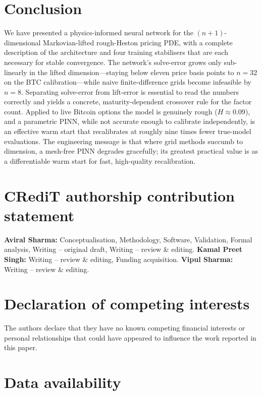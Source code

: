\documentclass[review,12pt]{elsarticle}
\begin{document}
\section{Conclusion}
\label{sec:conc}

We have presented a physics-informed neural network for the $(n{+}1)$-dimensional
Markovian-lifted rough-Heston pricing PDE, with a complete description of the
architecture and four training stabilisers that are each necessary for stable
convergence.  The network's solve-error grows only sub-linearly in the lifted
dimension---staying below eleven price basis points to $n{=}32$ on the BTC
calibration---while naive finite-difference grids become infeasible by $n{=}8$.
Separating solve-error from lift-error is essential to read the numbers correctly
and yields a concrete, maturity-dependent crossover rule for the factor count.
Applied to live Bitcoin options the model is genuinely rough ($H{\approx}0.09$), and
a parametric PINN, while not accurate enough to calibrate independently, is an
effective warm start that recalibrates at roughly nine times fewer true-model
evaluations.  The engineering message is that where grid methods succumb to
dimension, a mesh-free PINN degrades gracefully; its greatest practical value is
as a differentiable warm start for fast, high-quality recalibration.

\section*{CRediT authorship contribution statement}

\textbf{Aviral Sharma:} Conceptualisation, Methodology, Software, Validation,
Formal analysis, Writing -- original draft, Writing -- review \& editing.
\textbf{Kamal Preet Singh:} Writing -- review \& editing, Funding acquisition.
\textbf{Vipul Sharma:} Writing -- review \& editing.

\section*{Declaration of competing interests}

The authors declare that they have no known competing financial interests or
personal relationships that could have appeared to influence the work reported in
this paper.

\section*{Data availability}
\end{document}

